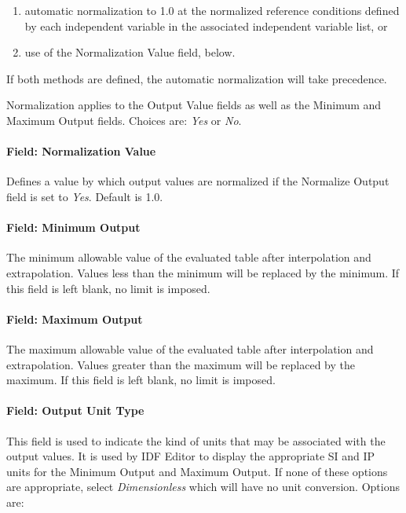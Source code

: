 \begin{enumerate}
  \item automatic normalization to 1.0 at the normalized reference conditions defined by each
  independent variable in the associated independent variable list, or
  \item use of the Normalization Value field, below.
\end{enumerate}

If both methods are defined, the automatic normalization will take precedence.

Normalization applies to the Output Value fields as well as the Minimum
and Maximum Output fields. Choices are: \emph{Yes} or \emph{No}.

\paragraph{Field: Normalization Value}\label{field-normalization-value}

Defines a value by which output values are normalized if the Normalize Output
field is set to \emph{Yes}. Default is 1.0.

\paragraph{Field: Minimum Output}\label{field-minimum-output}

The minimum allowable value of the evaluated table after interpolation
and extrapolation. Values less than the minimum will be replaced by the
minimum. If this field is left blank, no limit is imposed.

\paragraph{Field: Maximum Output}\label{field-maximum-output}

The maximum allowable value of the evaluated table after interpolation
and extrapolation. Values greater than the maximum will be replaced by
the maximum. If this field is left blank, no limit is imposed.

\paragraph{Field: Output Unit Type}\label{field-output-unit-type}

This field is used to indicate the kind of units that may be associated
with the output values. It is used by IDF Editor to display the
appropriate SI and IP units for the Minimum Output and Maximum Output.
If none of these options are appropriate, select \emph{Dimensionless}
which will have no unit conversion. Options are:

